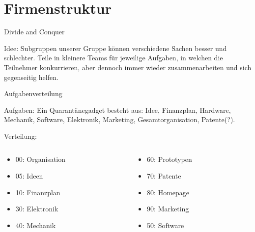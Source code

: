\documentclass{beamer}
\begin{document}
\section{Firmenstruktur}

\begin{frame}{Divide and Conquer}

\begin{alertblock}{Idee:}
Subgruppen unserer Gruppe k\"onnen verschiedene Sachen besser und schlechter. Teile in kleinere Teams f\"ur jeweilige Aufgaben, in welchen die Teilnehmer konkurrieren, aber dennoch immer wieder zusammenarbeiten und sich gegenseitig helfen.
\end{alertblock}

\end{frame}

\begin{frame}{Aufgabenverteilung}

\begin{exampleblock}{Aufgaben:}
Ein Quarant\"anegadget besteht aus: Idee, Finanzplan, Hardware, Mechanik, Software, Elektronik, Marketing, Gesamtorganisation, Patente(?). 
\end{exampleblock}


\begin{alertblock}{Verteilung:}
\begin{columns}[]

  \begin{column}{0.45\textwidth}
 
    \begin{itemize}
    \item 00: Organisation
    \item 05: Ideen
    \item 10: Finanzplan
    \item 30: Elektronik
    \item 40: Mechanik
    \end{itemize}
	
  \end{column}
  \begin{column}{0.45\textwidth}
    
    \begin{itemize}
    \item 60: Prototypen
    \item 70: Patente
    \item 80: Homepage
    \item 90: Marketing
    \item 50: Software
    \end{itemize}
	
  \end{column}
\end{columns}
\end{alertblock}


\end{frame}
\end{document}
